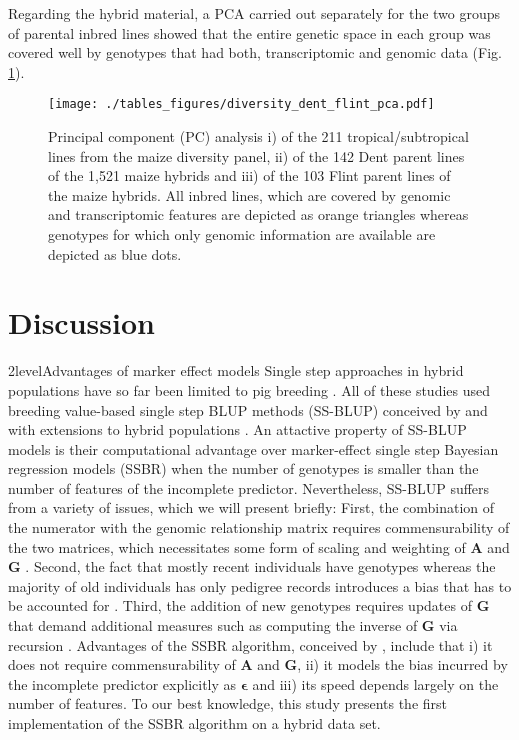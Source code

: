 \documentclass[12pt,titlepage]{article}
\begin{document}
Regarding the hybrid material, a PCA carried out separately for the two groups
of parental inbred lines showed that the entire genetic space in each group 
was covered well by genotypes that had both, transcriptomic and genomic data 
(Fig. \ref{fig:PCA}).

\begin{figure}[H]
\centering
\texttt{[image: ./tables\_figures/diversity\_dent\_flint\_pca.pdf]}
\caption{
  Principal component (PC) analysis i) of the 211 tropical/subtropical lines 
  from the maize diversity panel, ii) of the 142 Dent parent lines of the 1,521
  maize hybrids and iii) of the 103 Flint parent lines of the maize hybrids.
  All inbred lines, which are covered by genomic and transcriptomic features
  are depicted as orange triangles whereas genotypes for which only genomic
  information are available are depicted as blue dots.
}
\label{fig:PCA}
\end{figure}













\section*{Discussion}
\Genetics2level{Advantages of marker effect models}
Single step approaches in hybrid populations have so far been limited to pig
breeding \cite{Xiang2015,Xiang2016,Tusell2016}.
All of these studies used breeding value-based single step BLUP methods
(SS-BLUP) conceived by  and  with
extensions to hybrid populations \cite{Christensen2014,Christensen2015}.
An attactive property of SS-BLUP models is their computational advantage over 
marker-effect single step Bayesian regression models (SSBR) when the number of 
genotypes is smaller than the number of features of the incomplete predictor.
Nevertheless, SS-BLUP suffers from a variety of issues, which we will present
briefly:
First, the combination of the numerator with the genomic relationship matrix
requires commensurability of the two matrices, which necessitates some form of
scaling and weighting of $\mathbf{A}$ and $\mathbf{G}$
\cite{Christensen2012,Christensen2012a}.
Second, the fact that mostly recent individuals have genotypes whereas the 
majority of old individuals has only pedigree records introduces a bias that 
has to be accounted for \cite{Vitezica2011,Legarra2015,Garcia-Baccino2017}.
Third, the addition of new genotypes requires updates of $\mathbf{G}$ that
demand additional measures such as computing the inverse of $\mathbf{G}$ via
recursion
\cite{Misztal2014,Misztal2016,Misztal2016a,Fragomeni2015,Masuda2016,Pocrnic2016}.
Advantages of the SSBR algorithm, conceived by , include
that i) it does not require commensurability of $\mathbf{A}$ and $\mathbf{G}$, 
ii) it models the bias incurred by the incomplete predictor explicitly as 
$\mathbf{\epsilon}$ and iii) its speed depends largely on the number of 
features.
To our best knowledge, this study presents the first implementation of the SSBR 
algorithm on a hybrid data set.
\end{document}
